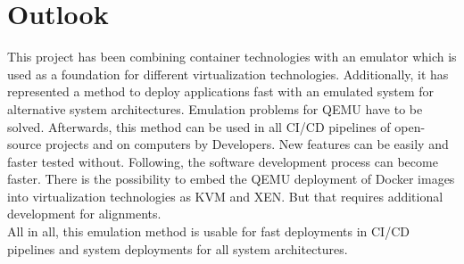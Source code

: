\chapter{Outlook}\label{ch:outlook}

This project has been combining container technologies with an emulator which is used as a foundation for different virtualization technologies. 
Additionally, it has represented a method to deploy applications fast with an emulated system for alternative system architectures.
Emulation problems for \gls{QEMU} have to be solved. Afterwards, this method can be used in all \gls{CI/CD} pipelines of open-source projects and on computers by Developers.
New features can be easily and faster tested without. Following, the software development process can become faster.
There is the possibility to embed the \gls{QEMU} deployment of Docker images into virtualization technologies as \gls{KVM} and \gls{XEN}.
But that requires additional development for alignments. \\
All in all, this emulation method is usable for fast deployments in \gls{CI/CD} pipelines and system deployments for all system architectures.
